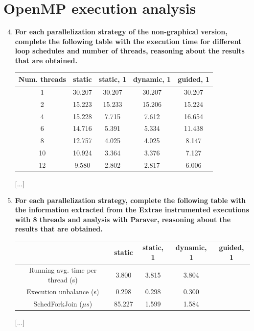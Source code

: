 \documentclass[a4paper,11pt]{article}
\begin{document}
\section{OpenMP execution analysis}
\begin{enumerate}
\setcounter{enumi}{3}
\item
\textbf{For each parallelization strategy of the non-graphical version, complete the following table with
    the execution time for different loop schedules and number of threads, reasoning about the results
    that are obtained.}
\begin{center}
\begin{tabular}{| c || c | c | c | c |}
\hline
\textbf{Num. threads} & \textbf{static} & \textbf{static, 1} & \textbf{dynamic, 1} & \textbf{guided, 1}
\\
\hline
\hline
1 & 30.207 & 30.207 & 30.207 & 30.207
\\
\hline
2 & 15.223 & 15.233 & 15.206 & 15.224
\\
\hline
4 & 15.228 & 7.715 & 7.612 & 16.654
\\
\hline
6 & 14.716 & 5.391 & 5.334 & 11.438
\\
\hline
8 & 12.757 & 4.025 & 4.025 & 8.147
\\
\hline
10 & 10.924 & 3.364 & 3.376 & 7.127
\\
\hline
12 & 9.580 & 2.802 & 2.817 & 6.006
\\
\hline
\end{tabular}
\end{center}
[...]
\setcounter{enumi}{4}
\item
\textbf{For each parallelization strategy, complete the following table with the information extracted from
    the Extrae instrumented executions with 8 threads and analysis with Paraver, reasoning about the
    results that are obtained.}
\begin{center}
\begin{tabular}{| c || c | c | c | c |}
\hline
\textbf{} & \textbf{static} & \textbf{static, 1} & \textbf{dynamic, 1} & \textbf{guided, 1}
\\
\hline
\hline
Running avg. time per thread (s) & 3.800 & 3.815 & 3.804
\\
\hline
Execution unbalance (s) & 0.298 & 0.298 & 0.300
\\
\hline
SchedForkJoin ($\mu s$) & 85.227 & 1.599 & 1.584 &
\\
\hline
\end{tabular}
\end{center}
[...]
\end{enumerate}
\end{document}
